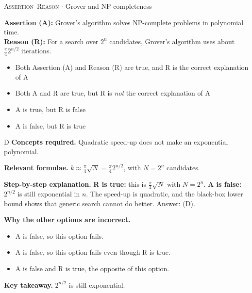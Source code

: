 \documentclass[11pt,a4paper]{article}
\newcommand{\optlabel}[1]{\textbf{(#1)}}
\newcommand{\correctlabel}[1]{\textcolor{okgreen}{\textbf{(#1)}\,\ding{51}}}
\newenvironment{qitem}[1]{\begin{list}{}{\setlength{\leftmargin}{3.3em}\setlength{\labelwidth}{3.1em}%
  \setlength{\labelsep}{0.2em}\setlength{\topsep}{3pt}\setlength{\parsep}{3pt}}\item[\textbf{Q.#1}\hfill]}{\end{list}}
\newcommand{\qsep}{\par\vspace{2pt}{\color{black!15}\hrule}\vspace{4pt}}
\newcommand{\qmeta}[2]{{\footnotesize\color{black!60}\textsc{#1} \;$\cdot$\; #2}\par}
\begin{document}
\begin{qitem}{77}
\qmeta{Assertion--Reason}{Grover and NP-completeness}
\textbf{Assertion (A):} Grover's algorithm solves NP-complete problems in polynomial time.\\[1mm]
\textbf{Reason (R):} For a search over $2^n$ candidates, Grover's algorithm uses about $\frac\pi4 2^{n/2}$ iterations.
\begin{itemize}[leftmargin=2.6em, labelsep=0.4em, itemsep=2pt, topsep=3pt]
\item[\optlabel{A}] Both Assertion (A) and Reason (R) are true, and R is the correct explanation of A
\item[\optlabel{B}] Both A and R are true, but R is \emph{not} the correct explanation of A
\item[\optlabel{C}] A is true, but R is false
\item[\correctlabel{D}] A is false, but R is true
\end{itemize}
\end{qitem}
\begin{solbox}{D}
\textbf{\color{brand}Concepts required.} Quadratic speed-up does not make an exponential polynomial.

\textbf{\color{brand}Relevant formulae.} $k \approx \frac\pi4\sqrt N = \frac\pi42^{n/2}$, with $N = 2^n$ candidates.

\textbf{\color{brand}Step-by-step explanation.} \textbf{R is true:} this is $\frac\pi4\sqrt N$ with $N = 2^n$. \textbf{A is false:} $2^{n/2}$ is still exponential in $n$. The speed-up is quadratic, and the black-box lower bound shows that generic search cannot do better. Answer: (D).

\textbf{\color{brand}Why the other options are incorrect.}
\begin{itemize}[leftmargin=2.4em, itemsep=1pt, topsep=2pt]
\item[\textbf{(A)}] A is false, so this option fails.
\item[\textbf{(B)}] A is false, so this option fails even though R is true.
\item[\textbf{(C)}] A is false and R is true, the opposite of this option.
\end{itemize}
\textbf{\color{brand}Key takeaway.} $2^{n/2}$ is still exponential.
\end{solbox}
\qsep
\end{document}

